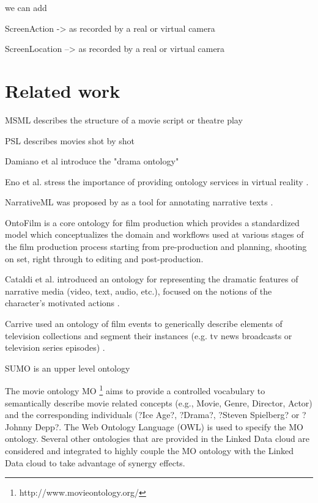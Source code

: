 \documentclass[a4paper,UKenglish]{oasics}
\begin{document}
we can add

ScreenAction -> as recorded by a real or virtual camera

ScreenLocation --> as recorded by a real or virtual camera





\section{Related work}

MSML describes the structure of a movie script or theatre play \cite{VanRijsselbergen09}

PSL describes movies shot by shot \cite{Ronfard13}

Damiano et al introduce the "drama ontology" \cite{Damiano05}

Eno et al. stress the importance of providing ontology services in virtual reality \cite{Eno11}.

NarrativeML was proposed by as a tool for annotating narrative texts \cite{Mani13}.


OntoFilm \cite{Chakravarthy09} is a core ontology for film production which  provides a standardized model which conceptualizes the domain and workflows used at various stages of the film production process starting from pre-production and planning, shooting on set, right through to editing and post-production. 

Cataldi et al. introduced an ontology for representing the dramatic features of narrative media (video, text, audio, etc.), focused on the notions of the character's motivated actions \cite{Cataldi11}.

Carrive used an ontology of film events to generically describe elements of television collections
and segment their instances (e.g. tv news broadcasts or television series episodes) \cite{Carrive98}.

SUMO is an upper level ontology

The movie ontology MO \footnote{http://www.movieontology.org/}
aims to provide a controlled vocabulary to semantically describe movie related concepts (e.g., Movie, Genre, Director, Actor) and the corresponding individuals (?Ice Age?, ?Drama?, ?Steven Spielberg? or ?Johnny Depp?. The Web Ontology Language (OWL) is used to specify the MO ontology. Several other ontologies that are provided in the Linked Data cloud are considered and integrated to highly couple the MO ontology with the Linked Data cloud to take advantage of synergy effects.
\end{document}
